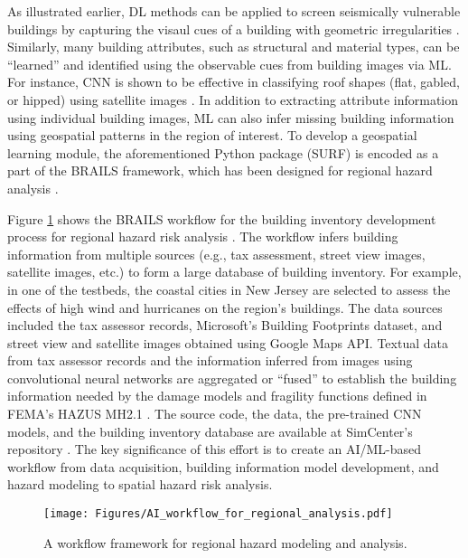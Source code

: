 As illustrated earlier, DL methods can be applied to screen seismically vulnerable buildings by capturing the visaul cues of a building with geometric irregularities \citep{yu2020largescale}. Similarly, many building attributes, such as structural and material types, can be ``learned'' and identified using the observable cues from building images via ML. For instance, CNN is shown to be effective in classifying roof shapes (flat, gabled, or hipped) using satellite images \citep{yu2020largescale}. In addition to extracting attribute information using individual building images, ML can also infer missing building information using geospatial patterns in the region of interest. To develop a geospatial learning module, the aforementioned Python package (SURF) is encoded as a part of the BRAILS framework, which has been designed for regional hazard analysis \citep{wang2019surf}. 

Figure \ref{fig:AI_workflow_for_regional_analysis} shows the BRAILS workflow for the building inventory development process for regional hazard risk analysis \citep{wang2020flood}. The workflow infers building information from multiple sources (e.g., tax assessment, street view images, satellite images, etc.) to form a large database of building inventory. For example, in one of the testbeds, the coastal cities in New Jersey are selected to assess the effects of high wind and hurricanes on the region's buildings. The data sources included the tax assessor records, Microsoft's Building Footprints dataset, and street view and satellite images obtained using Google Maps API. Textual data from tax assessor records and the information inferred from images using convolutional neural networks are aggregated or ``fused'' to establish the building information needed by the damage models and fragility functions defined in FEMA's HAZUS MH2.1 \citep{fema2011earthquaketechnical}. The source code, the data, the pre-trained CNN models, and the building inventory database are available at SimCenter's repository \citep{yu2019building}. The key significance of this effort is to create an AI/ML-based workflow from data acquisition, building information model development, and hazard modeling to spatial hazard risk analysis. 

\begin{figure}[htb]
    \centering
    \texttt{[image: Figures/AI\_workflow\_for\_regional\_analysis.pdf]}
    \caption{A workflow framework for regional hazard modeling and analysis.}
    \label{fig:AI_workflow_for_regional_analysis}
\end{figure}

